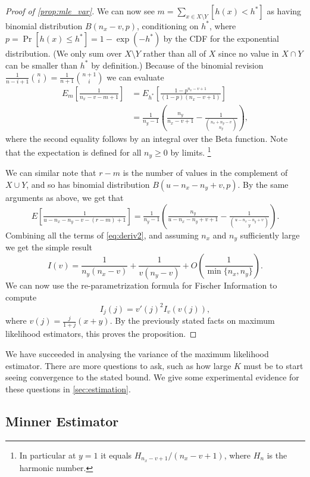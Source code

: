\begin{proof}[Proof of \cref{prop:mle_var}]
   We can now see $m=\sum_{x\in X\setminus Y} [h(x) < h^*]$ as having binomial distribution $B(n_x-v, p)$, conditioning on $h^*$, where $p=\Pr[h(x)\le h^*] = 1-\exp(-h^*)$ by the CDF for the exponential distribution.
   (We only sum over $X\setminus Y$ rather than all of $X$ since no value in $X\cap Y$ can be smaller than $h^*$ by definition.)
   Because of the binomial revision
   $\frac1{n-i+1}\binom{n}{i} = \frac1{n+1}\binom{n+1}{i}$
   we can evaluate
   \begin{align}
      E_m\left[\tfrac1{n_x-v-m+1}\right]
      &= E_{h^*}\left[\tfrac{1-p^{n_x-v+1}}{(1-p)(n_x-v+1)}\right]
    \\&= \tfrac1{n_y-1}\left(\tfrac{n_y}{n_x-v+1} - \tfrac1{\binom{n_x+n_y-v}{n_y}}\right),
   \end{align}
   where the second equality follows by an integral over the Beta function.
   Note that the expectation is defined for all $n_y\ge 0$ by limits.%
   \footnote{In particular at $y=1$ it equals $H_{n_x-v+1}/(n_x-v+1)$, where $H_n$ is the harmonic number.}

   We can similar note that $r-m$ is the number of values in the complement of $X\cup Y$, and so has binomial distribution $B(u-n_x-n_y+v, p)$.
   By the same arguments as above, we get that
   \[
      E\left[\tfrac1{u-n_x-n_y-v-(r-m)+1}\right]
      = \tfrac1{n_y-1}\left(\tfrac{n_y}{u-n_x-n_y+v+1} - \tfrac1{\binom{u-n_x-n_y+v}{y}}\right).
   \]
   Combining all the terms of \cref{eq:deriv2}, and assuming $n_x$ and $n_y$ sufficiently large we get the simple result
   \[
   I(v)
   = \frac{1}{n_y(n_x-v)} + \frac1{v(n_y-v)} + O\left( \frac{1}{\min\{n_x,n_y\}} \right).
   \]
   We can now use the re-parametrization formula for Fischer Information to compute
   \[
      I_j(j) = v'(j)^{2}I_v(v(j)),
   \]
   where $v(j) = \frac{j}{1+j}(x+y)$.
   By the previously stated facts on maximum likelihood estimators, this proves the proposition.
\end{proof}

We have succeeded in analysing the variance of the maximum likelihood estimator.
There are more questions to ask, such as how large $K$ must be to start seeing convergence to the stated bound.
We give some experimental evidence for these questions in \cref{sec:estimation}.

\subsection{Minner Estimator}\label{sec:minner}

